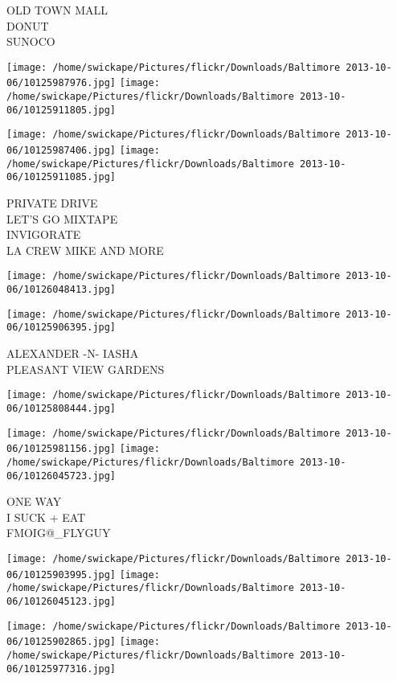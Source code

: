 \documentclass[10pt,letterpaper]{article}
\begin{document}
OLD TOWN MALL\\
DONUT\\
SUNOCO\\
\pagebreak

\texttt{[image: /home/swickape/Pictures/flickr/Downloads/Baltimore 2013-10-06/10125987976.jpg]}
\texttt{[image: /home/swickape/Pictures/flickr/Downloads/Baltimore 2013-10-06/10125911805.jpg]}

\texttt{[image: /home/swickape/Pictures/flickr/Downloads/Baltimore 2013-10-06/10125987406.jpg]}
\texttt{[image: /home/swickape/Pictures/flickr/Downloads/Baltimore 2013-10-06/10125911085.jpg]}

PRIVATE DRIVE\\
LET'S GO MIXTAPE\\
INVIGORATE\\
LA CREW MIKE AND MORE\\
\pagebreak

\texttt{[image: /home/swickape/Pictures/flickr/Downloads/Baltimore 2013-10-06/10126048413.jpg]}

\vspace{0.25in}
\texttt{[image: /home/swickape/Pictures/flickr/Downloads/Baltimore 2013-10-06/10125906395.jpg]}

ALEXANDER {-}N{-} IASHA\\
PLEASANT VIEW GARDENS\\
\pagebreak

\texttt{[image: /home/swickape/Pictures/flickr/Downloads/Baltimore 2013-10-06/10125808444.jpg]}

\vspace{0.25in}
\texttt{[image: /home/swickape/Pictures/flickr/Downloads/Baltimore 2013-10-06/10125981156.jpg]}
\texttt{[image: /home/swickape/Pictures/flickr/Downloads/Baltimore 2013-10-06/10126045723.jpg]}

ONE WAY\\
I SUCK + EAT\\
FMOIG@\_FLYGUY\\
\pagebreak

\texttt{[image: /home/swickape/Pictures/flickr/Downloads/Baltimore 2013-10-06/10125903995.jpg]}
\texttt{[image: /home/swickape/Pictures/flickr/Downloads/Baltimore 2013-10-06/10126045123.jpg]}

\texttt{[image: /home/swickape/Pictures/flickr/Downloads/Baltimore 2013-10-06/10125902865.jpg]}
\texttt{[image: /home/swickape/Pictures/flickr/Downloads/Baltimore 2013-10-06/10125977316.jpg]}
\end{document}
